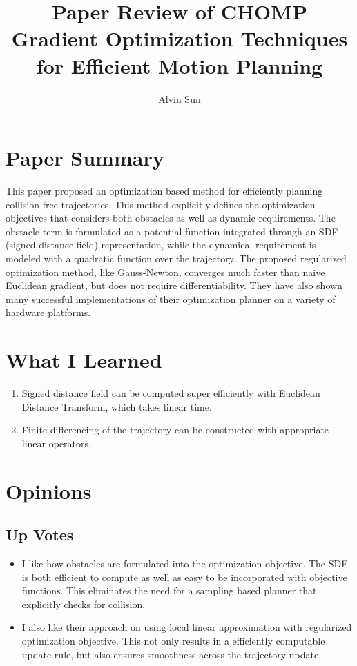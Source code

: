 \documentclass[10pt, twocolumn]{article}
\title{\vspace{-2.0em}Paper Review of CHOMP\\Gradient Optimization Techniques for Efficient Motion Planning}
\author{Alvin Sun}
\begin{document}
\maketitle

\section{Paper Summary}
This paper proposed an optimization based method for efficiently planning
collision free trajectories. This method explicitly defines the optimization
objectives that considers both obstacles as well as dynamic requirements.
The obstacle term is formulated as a potential function integrated through
an SDF (signed distance field) representation, while the dynamical requirement
is modeled with a quadratic function over the trajectory. The proposed
regularized optimization method, like Gauss-Newton, converges much faster than
naive Euclidean gradient, but does not require differentiability. They have also
shown many successful implementations of their optimization planner
on a variety of hardware platforms.

\section{What I Learned}
\begin{enumerate}
  \item Signed distance field can be computed super efficiently with
    Euclidean Distance Transform, which takes linear time.
  \item Finite differencing of the trajectory can be constructed with
    appropriate linear operators.
\end{enumerate}

\section{Opinions}

\subsection{Up Votes}
\begin{itemize}
  \item I like how obstacles are formulated into the optimization objective.
    The SDF is both efficient to compute as well as easy to be incorporated
    with objective functions. This eliminates the need for a sampling based
    planner that explicitly checks for collision.
  \item I also like their approach on using local linear approximation with
    regularized optimization objective. This not only results in a efficiently
    computable update rule, but also ensures smoothness across the trajectory
    update.
\end{itemize}
\end{document}
